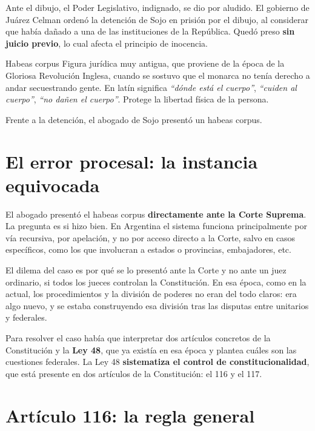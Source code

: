 \documentclass[12pt,oneside,a4paper]{book}
\begin{document}
Ante el dibujo, el Poder Legislativo, indignado, se dio por aludido. El gobierno de Juárez Celman ordenó la detención de Sojo en prisión por el dibujo, al considerar que había dañado a una de las instituciones de la República. Quedó preso \textbf{sin juicio previo}, lo cual afecta el principio de inocencia.

\begin{definition}{Habeas corpus}
Figura jurídica muy antigua, que proviene de la época de la Gloriosa Revolución Inglesa, cuando se sostuvo que el monarca no tenía derecho a andar secuestrando gente. En latín significa \textit{``dónde está el cuerpo''}, \textit{``cuiden al cuerpo''}, \textit{``no dañen el cuerpo''}. Protege la libertad física de la persona.
\end{definition}

Frente a la detención, el abogado de Sojo presentó un habeas corpus.

\section{El error procesal: la instancia equivocada}

El abogado presentó el habeas corpus \textbf{directamente ante la Corte Suprema}. La pregunta es si hizo bien. En Argentina el sistema funciona principalmente por vía recursiva, por apelación, y no por acceso directo a la Corte, salvo en casos específicos, como los que involucran a estados o provincias, embajadores, etc.

El dilema del caso es por qué se lo presentó ante la Corte y no ante un juez ordinario, si todos los jueces controlan la Constitución. En esa época, como en la actual, los procedimientos y la división de poderes no eran del todo claros: era algo nuevo, y se estaba construyendo esa división tras las disputas entre unitarios y federales.

Para resolver el caso había que interpretar dos artículos concretos de la Constitución y la \textbf{Ley 48}, que ya existía en esa época y plantea cuáles son las cuestiones federales. La Ley 48 \textbf{sistematiza el control de constitucionalidad}, que está presente en dos artículos de la Constitución: el 116 y el 117.

\section{Artículo 116: la regla general}
\end{document}
